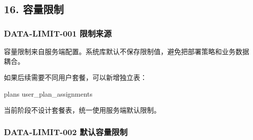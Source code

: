 \documentclass[
  a4paper,
  UTF8]{ctexart}
\newenvironment{Shaded}{}{}
\newcommand{\NormalTok}[1]{#1}
\begin{document}
\hypertarget{ux5bb9ux91cfux9650ux5236}{%
\subsection{16. 容量限制}\label{ux5bb9ux91cfux9650ux5236}}

\hypertarget{data-limit-001-ux9650ux5236ux6765ux6e90}{%
\subsubsection{DATA-LIMIT-001
限制来源}\label{data-limit-001-ux9650ux5236ux6765ux6e90}}

容量限制来自服务端配置。系统库默认不保存限制值，避免把部署策略和业务数据耦合。

如果后续需要不同用户套餐，可以新增独立表：

\begin{Shaded}
\begin{Highlighting}[]
\NormalTok{plans}
\NormalTok{user\_plan\_assignments}
\end{Highlighting}
\end{Shaded}

当前阶段不设计套餐表，统一使用服务端默认限制。

\hypertarget{data-limit-002-ux9ed8ux8ba4ux5bb9ux91cfux9650ux5236}{%
\subsubsection{DATA-LIMIT-002
默认容量限制}\label{data-limit-002-ux9ed8ux8ba4ux5bb9ux91cfux9650ux5236}}
\end{document}
